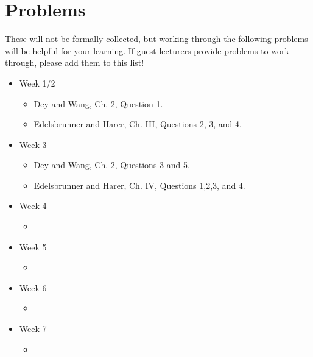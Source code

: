 \documentclass{article}
\begin{document}
\section*{Problems}

These will not be formally collected, but working through the following problems
will be helpful for your learning.  If guest lecturers provide problems to work
through, please add them to this list!

\begin{itemize}
    \item Week 1/2
        \begin{itemize}
            \item Dey and Wang, Ch. 2, Question 1.
            \item Edelsbrunner and Harer, Ch. III, Questions 2, 3, and 4.
        \end{itemize}
    \item Week 3
        \begin{itemize}
            \item Dey and Wang, Ch. 2, Questions 3 and 5.
            \item Edelsbrunner and Harer, Ch. IV, Questions 1,2,3, and 4.
        \end{itemize}
    \item Week 4
        \begin{itemize}
            \item \todo{}
        \end{itemize}
    \item Week 5
        \begin{itemize}
            \item \todo{}
        \end{itemize}
    \item Week 6
        \begin{itemize}
            \item \todo{}
        \end{itemize}
    \item Week 7
        \begin{itemize}
            \item \todo{}
        \end{itemize}
\end{itemize}
\end{document}
